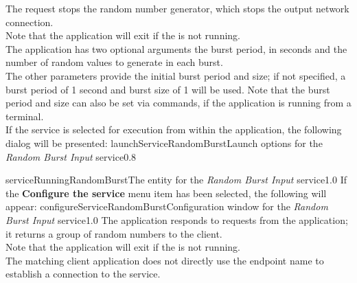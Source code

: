 The  request stops the random
number generator, which stops the output \yarp{} network connection.\\

Note that the application will exit if the  is not
running.\\

The application has two optional arguments \longDash{} the burst period, in seconds and
the number of random values to generate in each burst.
\insertAppParameters
{}
\insertInputServiceComment\\

The other parameters provide the initial burst period and size; if not specified, a burst
period of 1 second and burst size of 1 will be used.
Note that the burst period and size can also be set via commands, if the application is
running from a terminal.\\

\insertStandardServiceCommands
\condPage{}
If the service is selected for execution from within the \emph{\MMMU} application, the
following dialog will be presented:
%
{launchServiceRandomBurst}{Launch options for the \emph{Random Burst Input} service}{0.8}

%
{serviceRunningRandomBurst}{The \emph{\MMMU} entity for the \emph{Random Burst Input}
service}{1.0}
\condPage{}
If the \textbf{Configure the service} menu item has been selected, the following will
appear:
%
{configureServiceRandomBurst}{Configuration window for the \emph{Random Burst Input}
service}{1.0}
\condPage
{}
The  application responds to
 requests from the
 application; it returns a group of random
numbers to the client.\\

Note that the application will exit if the  is not
running.\\

\insertAutoAppParameters
{}
The matching client application does not directly use the endpoint name to establish a
connection to the service.\\


